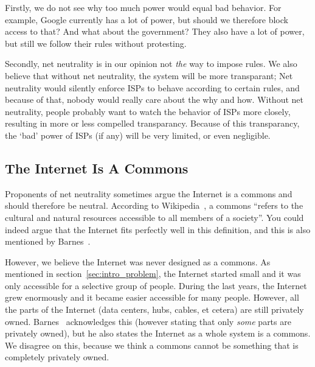 Firstly, we do not see why too much power would equal bad behavior.
For example, Google currently has a lot of power, but should we therefore block access to that?
And what about the government?
They also have a lot of power, but still we follow their rules without protesting.

Secondly, net neutrality is in our opinion not \emph{the} way to impose rules.
We also believe that without net neutrality, the system will be more transparant;
Net neutrality would silently enforce \acp{ISP} to behave according to certain rules, and because of that, nobody would really care about the why and how.
Without net neutrality, people probably want to watch the behavior of \acp{ISP} more closely, resulting in more or less compelled transparancy.
Because of this transparancy, the `bad' power of \acp{ISP} (if any) will be very limited, or even negligible.

\subsection{The Internet Is A Commons}
Proponents of net neutrality sometimes argue the Internet is a commons and should therefore be neutral.
According to Wikipedia~\cite{wikipedia2014commons}, a commons ``refers to the cultural and natural resources accessible to all members of a society''.
You could indeed argue that the Internet fits perfectly well in this definition, and this is also mentioned by Barnes~\cite{barnes2003capitalism}.

However, we believe the Internet was never designed as a commons.
As mentioned in section~\ref{sec:intro_problem}, the Internet started small and it was only accessible for a selective group of people.
During the last years, the Internet grew enormously and it became easier accessible for many people.
However, all the parts of the Internet (data centers, hubs, cables, et cetera) are still privately owned.
Barnes~\cite{barnes2003capitalism} acknowledges this (however stating that only \emph{some} parts are privately owned), but he also states the Internet as a whole system is a commons.
We disagree on this, because we think a commons cannot be something that is completely privately owned.